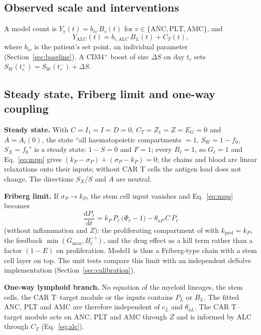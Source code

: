 \documentclass[11pt]{article}
\newcommand{\dd}{\mathrm{d}}
\begin{document}
\subsection{Observed scale and interventions}
A model count is $Y_v(t)=b_{iv}\,B_v(t)$ for $v\in\{\mathrm{ANC},\mathrm{PLT},\mathrm{AMC}\}$, and
\begin{equation}
Y_{\mathrm{ALC}}(t)=b_{i,\mathrm{ALC}}\,B_L(t)+C_T(t), \label{eq:alc}
\end{equation}
where $b_{iv}$ is the patient's set point, an individual parameter (Section~\ref{sec:baseline}). A CD34$^+$ boost of size $\Delta S$ on day $t_c$ sets $S_W(t_c^+)=S_W(t_c^-)+\Delta S$.

\subsection{Steady state, Friberg limit and one-way coupling}\label{sec:steady}
\textbf{Steady state.} With $C=I_1=I=D=0$, $C_T=Z_1=Z=E_G=0$ and $A=A_i(0)$, the state ``all haematopoietic compartments $=1$, $S_W=1-f_0$, $S_X=f_0$'' is a steady state: $1-S=0$ and $F=1$; every $B_\ell=1$, so $G_\ell=1$ and Eq.~\ref{eq:mpp} gives $(k_P-\sigma_P)+(\sigma_P-k_P)=0$; the chains and blood are linear relaxations onto their inputs; without CAR T cells the antigen load does not change. The directions $S_X/S$ and $A$ are neutral.

\textbf{Friberg limit.} If $\sigma_P\to k_P$, the stem cell input vanishes and Eq.~\ref{eq:mpp} becomes
\begin{equation*}
\frac{\dd P_\ell}{\dd t} = k_P\,P_\ell\,\bigl(\Phi_\ell-1\bigr) - \theta_{aP}\,C\,P_\ell
\end{equation*}
(without inflammation and $Z$): the proliferating compartment of \citet{friberg2002} with $k_{\mathrm{prol}}=k_P$, the feedback $\min(G_{\max},B_\ell^{-\gamma})$, and the drug effect as a kill term rather than a factor $(1-E)$ on proliferation. Model1 is thus a Friberg-type chain with a stem cell layer on top. The unit tests compare this limit with an independent deSolve implementation (Section~\ref{sec:calibration}).

\textbf{One-way lymphoid branch.} No equation of the myeloid lineages, the stem cells, the CAR T--target module or the inputs contains $P_L$ or $B_L$. The fitted ANC, PLT and AMC are therefore independent of $c_L$ and $\theta_{aL}$. The CAR T--target module acts on ANC, PLT and AMC through $Z$ and is informed by ALC through $C_T$ (Eq.~\ref{eq:alc}).
\end{document}
